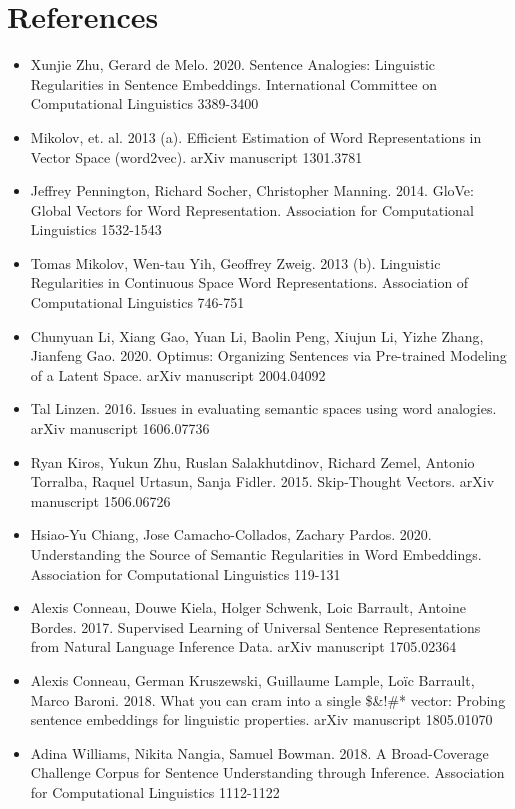\documentclass[11pt]{article}
\begin{document}
\section{References}
\label{sec:org0c5ef21}
\begin{itemize}
\item Xunjie Zhu, Gerard de Melo. 2020. Sentence Analogies: Linguistic Regularities in Sentence Embeddings. International Committee on Computational Linguistics 3389-3400
\item Mikolov, et. al. 2013 (a). Efficient Estimation of Word Representations in Vector Space (word2vec). arXiv manuscript 1301.3781
\item Jeffrey Pennington, Richard Socher, Christopher Manning. 2014. GloVe: Global Vectors for Word Representation. Association for Computational Linguistics 1532-1543
\item Tomas Mikolov, Wen-tau Yih, Geoffrey Zweig. 2013 (b). Linguistic Regularities in Continuous Space Word Representations. Association of Computational Linguistics 746-751
\item Chunyuan Li, Xiang Gao, Yuan Li, Baolin Peng, Xiujun Li, Yizhe Zhang, Jianfeng Gao. 2020.  Optimus: Organizing Sentences via Pre-trained Modeling of a Latent Space. arXiv manuscript 2004.04092
\item Tal Linzen. 2016. Issues in evaluating semantic spaces using word analogies. arXiv manuscript 1606.07736
\item Ryan Kiros, Yukun Zhu, Ruslan Salakhutdinov, Richard Zemel, Antonio Torralba, Raquel Urtasun, Sanja Fidler. 2015. Skip-Thought Vectors. arXiv manuscript 1506.06726
\item Hsiao-Yu Chiang, Jose Camacho-Collados, Zachary Pardos. 2020. Understanding the Source of Semantic Regularities in Word Embeddings. Association for Computational Linguistics 119-131
\item Alexis Conneau, Douwe Kiela, Holger Schwenk, Loic Barrault, Antoine Bordes. 2017. Supervised Learning of Universal Sentence Representations from Natural Language Inference Data. arXiv manuscript 1705.02364
\item Alexis Conneau, German Kruszewski, Guillaume Lample, Loïc Barrault, Marco Baroni. 2018. What you can cram into a single \$\&!\#* vector: Probing sentence embeddings for linguistic properties. arXiv manuscript 1805.01070
\item Adina Williams, Nikita Nangia, Samuel Bowman. 2018. A Broad-Coverage Challenge Corpus for Sentence Understanding through Inference. Association for Computational Linguistics 1112-1122

\end{itemize}
\end{document}
